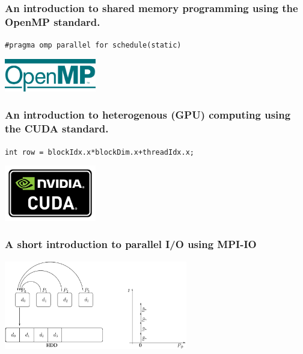 \documentclass{beamer}
\begin{document}
\begin{frame}\frametitle{An introduction to shared memory programming
                         using the OpenMP standard.}
\begin{center}
\texttt{\#pragma omp parallel for schedule(static)}
\end{center}
\begin{center}
\includegraphics[width=4cm]{openmp}
\end{center}
\end{frame}

\begin{frame}\frametitle{An introduction to heterogenous (GPU) computing
                         using the CUDA standard.}
\begin{center}
  \texttt{int row = blockIdx.x*blockDim.x+threadIdx.x;}
\end{center}
\begin{center}
\includegraphics[width=4cm]{cuda}
\end{center}
\end{frame}

\begin{frame}\frametitle{A short introduction to parallel I/O using MPI-IO}
  \begin{center}
    \includegraphics[width=8cm]{serial}
  \end{center}
\end{frame}
\end{document}
